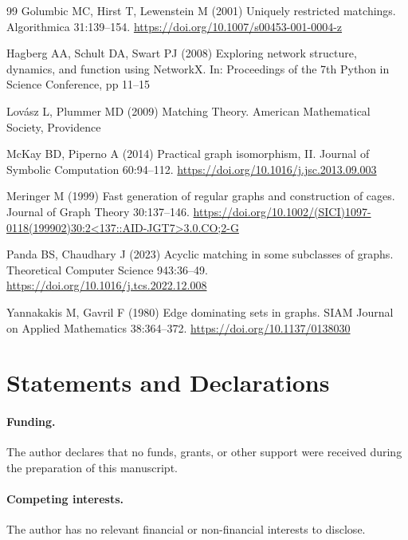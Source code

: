 \documentclass[smallextended,natbib,nospthms]{svjour3}
\theoremstyle{definition}
\theoremstyle{remark}
\begin{document}
\begin{thebibliography}{99}
Golumbic MC, Hirst T, Lewenstein M (2001) Uniquely restricted matchings.
Algorithmica 31:139--154. \url{https://doi.org/10.1007/s00453-001-0004-z}

Hagberg AA, Schult DA, Swart PJ (2008) Exploring network structure, dynamics,
and function using NetworkX. In: Proceedings of the 7th Python in Science
Conference, pp 11--15

Lov{\'a}sz L, Plummer MD (2009) Matching Theory. American Mathematical
Society, Providence

McKay BD, Piperno A (2014) Practical graph isomorphism, II. Journal of
Symbolic Computation 60:94--112. \url{https://doi.org/10.1016/j.jsc.2013.09.003}

Meringer M (1999) Fast generation of regular graphs and construction of cages.
Journal of Graph Theory 30:137--146.
\url{https://doi.org/10.1002/(SICI)1097-0118(199902)30:2<137::AID-JGT7>3.0.CO;2-G}

Panda BS, Chaudhary J (2023) Acyclic matching in some subclasses of graphs.
Theoretical Computer Science 943:36--49.
\url{https://doi.org/10.1016/j.tcs.2022.12.008}

Yannakakis M, Gavril F (1980) Edge dominating sets in graphs. SIAM Journal on
Applied Mathematics 38:364--372. \url{https://doi.org/10.1137/0138030}

\end{thebibliography}

\section*{Statements and Declarations}

\paragraph{Funding.}
The author declares that no funds, grants, or other support were received
during the preparation of this manuscript.

\paragraph{Competing interests.}
The author has no relevant financial or non-financial interests to disclose.
\end{document}
